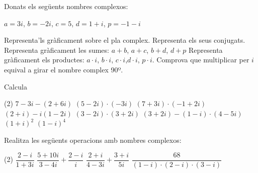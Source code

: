 \begin{mylist}
\exer
Donats els següents nombres complexos:

\begin{center}
	$a=3i$, \quad
	$b=-2i$,\quad
	$c=5$,\quad
	$d=1+i$,\quad
	$p= -1 -i$
\end{center}

\begin{tasks}
	\task Representa'ls gràficament sobre el pla complex. Representa els seus conjugats.
	\task Representa gràficament les sumes: $a+b$, \quad $a+c$, \quad $b+d$, \quad $d+p$
	\task Representa gràficament els productes: $a\cdot i$, \quad  $b\cdot i$, \quad $c\cdot i$,\quad $d\cdot i$, \quad $p\cdot i$. Comprova que multiplicar per $i$ equival a girar el nombre complex 90º.
\end{tasks} 

\vspace{3cm}

	\exer[1] Calcula

	\begin{tasks}(2)
		\task  $7 - 3i - (2 + 6 i)$
		\task  $(5 - 2i)\cdot (-3 i)$
		\task  $( 7 + 3 i) \cdot (-1 + 2 i)$
		\task  $(2+i)-i (1-2 i)$
		\task $(3-2 i) \cdot (3+ 2 i)$
		\task $(3 + 2i) - (1-i)\cdot(4-5i)$
	    \task $(1 + i)^2$
		\task $(1 - i)^4$
	\end{tasks}
	\answers[cols=2]{[
			 $5 -9i$,
			 $-6-15i$,
			 $-13+11i$,
			 0,
			 13,
			 $4 + 10i$,
			 $2i$,
			 $-4$]}
 
	\exer[1]
	Realitza les següents operacions amb nombres complexos:
	\begin{tasks}(2)
		\task $\dfrac{2-i}{1+3 i}$
		\task $\dfrac{5+10 i}{3-4 i}+\dfrac{2-i}{i}$
		\task $\dfrac{2+i}{4-3 i} + \dfrac{3+i}{5 i}$
		\task $\dfrac{68}{(1-i) \cdot (2-i) \cdot (3-i)}$
	\end{tasks}
	 
 
\end{mylist}

